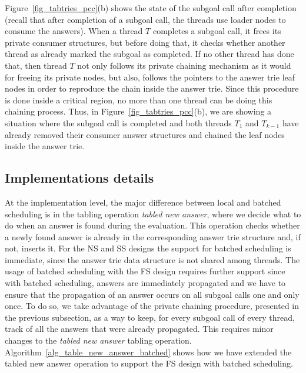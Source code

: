 \documentclass{llncs}
\begin{document}
Figure~\ref{fig_tabtries_pcc}(b) shows the state of the subgoal call
after completion (recall that after completion of a subgoal call, the
threads use loader nodes to consume the answers). When a thread $T$
completes a subgoal call, it frees its private consumer structures,
but before doing that, it checks whether another thread as already
marked the subgoal as completed. If no other thread has done that,
then thread $T$ not only follows its private chaining mechanism as it
would for freeing its private nodes, but also, follows the pointers to
the answer trie leaf nodes in order to reproduce the chain inside the
answer trie. Since this procedure is done inside a critical region, no
more than one thread can be doing this chaining process. Thus, in
Figure~\ref{fig_tabtries_pcc}(b), we are showing a situation where the
subgoal call is completed and both threads $T_1$ and $T_{k-1}$ have
already removed their consumer answer structures and chained the leaf
nodes inside the answer trie.

\subsection{Implementations details}

At the implementation level, the major difference between local and
batched scheduling is in the tabling operation \emph{tabled new
  answer}, where we decide what to do when an answer is found during
the evaluation. This operation checks whether a newly found answer is
already in the corresponding answer trie structure and, if not,
inserts it. For the NS and SS designs the support for batched
scheduling is immediate, since the answer trie data structure is not
shared among threads. The usage of batched scheduling with the FS
design requires further support since with batched scheduling, answers
are immediately propagated and we have to ensure that the propagation
of an answer occurs on all subgoal calls one and only once. To do so,
we take advantage of the private chaining procedure, presented in the
previous subsection, as a way to keep, for every subgoal call of every
thread, track of all the answers that were already propagated. This
requires minor changes to the \emph{tabled new answer} tabling
operation. Algorithm~\ref{alg_table_new_answer_batched} shows how we
have extended the tabled new answer operation to support the FS design
with batched scheduling.
\end{document}
